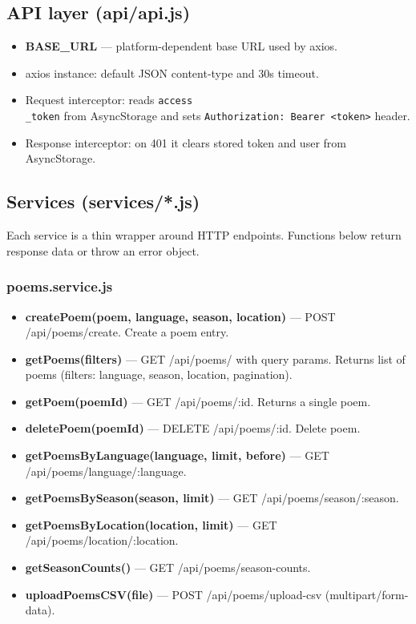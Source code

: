\documentclass[11pt]{article}
\begin{document}
\subsection{API layer (api/api.js)}
\begin{itemize}
	\item \textbf{BASE\_URL} — platform-dependent base URL used by axios.
	\item axios instance: default JSON content-type and 30s timeout.
	\item Request interceptor: reads \texttt{access\\_token} from AsyncStorage and sets \texttt{Authorization: Bearer <token>} header.
	\item Response interceptor: on 401 it clears stored token and user from AsyncStorage.
\end{itemize}

\subsection{Services (services/*.js)}
Each service is a thin wrapper around HTTP endpoints. Functions below return response data or throw an error object.

\subsubsection{poems.service.js}
\begin{itemize}
	\item \textbf{createPoem(poem, language, season, location)} — POST /api/poems/create. Create a poem entry.
	\item \textbf{getPoems(filters)} — GET /api/poems/ with query params. Returns list of poems (filters: language, season, location, pagination).
	\item \textbf{getPoem(poemId)} — GET /api/poems/:id. Returns a single poem.
	\item \textbf{deletePoem(poemId)} — DELETE /api/poems/:id. Delete poem.
	\item \textbf{getPoemsByLanguage(language, limit, before)} — GET /api/poems/language/:language.
	\item \textbf{getPoemsBySeason(season, limit)} — GET /api/poems/season/:season.
	\item \textbf{getPoemsByLocation(location, limit)} — GET /api/poems/location/:location.
	\item \textbf{getSeasonCounts()} — GET /api/poems/season-counts.
	\item \textbf{uploadPoemsCSV(file)} — POST /api/poems/upload-csv (multipart/form-data).
\end{itemize}
\end{document}
